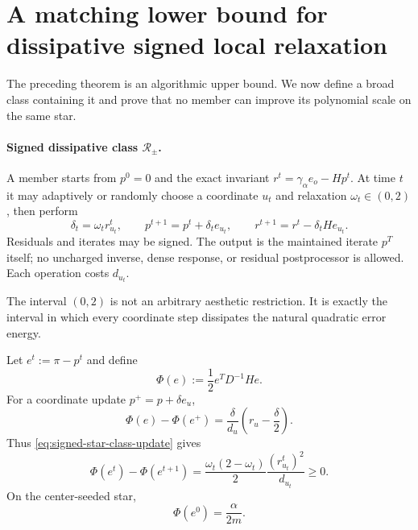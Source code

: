 \section{A matching lower bound for dissipative signed local relaxation}
\label{sec:signed-star-signed-lower}

The preceding theorem is an algorithmic upper bound.  We now define a broad
class containing it and prove that no member can improve its polynomial scale
on the same star.

\paragraph{Signed dissipative class $\mathcal R_{\pm}$.}
A member starts from $p^0=0$ and the exact invariant
$r^t=\gamma_\alpha e_o-Hp^t$.  At time $t$ it may adaptively or randomly
choose a coordinate $u_t$ and relaxation $\omega_t\in(0,2)$, then perform
\begin{equation}
  \delta_t=\omega_t r^t_{u_t},
  \qquad
  p^{t+1}=p^t+\delta_t e_{u_t},
  \qquad
  r^{t+1}=r^t-\delta_tHe_{u_t}.
  \label{eq:signed-star-class-update}
\end{equation}
Residuals and iterates may be signed.  The output is the maintained iterate
$p^T$ itself; no uncharged inverse, dense response, or residual postprocessor
is allowed.  Each operation costs $d_{u_t}$.

The interval $(0,2)$ is not an arbitrary aesthetic restriction.  It is
exactly the interval in which every coordinate step dissipates the natural
quadratic error energy.

\begin{lemma}
\label{lem:signed-star-energy}
Let $e^t:=\pi-p^t$ and define
\begin{equation}
  \Phi(e):=\frac12 e^TD^{-1}He.
  \label{eq:signed-star-energy}
\end{equation}
For a coordinate update $p^+=p+\delta e_u$,
\begin{equation}
  \Phi(e)-\Phi(e^+)
  =\frac{\delta}{d_u}\left(r_u-\frac\delta2\right).
  \label{eq:signed-star-energy-identity}
\end{equation}
Thus \eqref{eq:signed-star-class-update} gives
\begin{equation}
  \Phi(e^t)-\Phi(e^{t+1})
  =\frac{\omega_t(2-\omega_t)}{2}
      \frac{(r^t_{u_t})^2}{d_{u_t}}
  \ge0.
  \label{eq:signed-star-energy-descent}
\end{equation}
On the center-seeded star,
\begin{equation}
  \Phi(e^0)=\frac{\alpha}{2m}.
  \label{eq:signed-star-initial-energy}
\end{equation}
\end{lemma}

